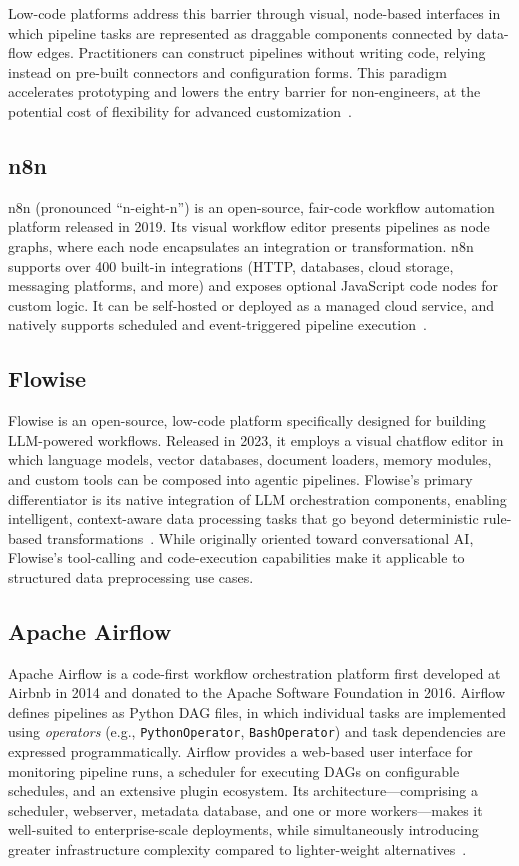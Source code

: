 \documentclass[journal]{IEEEtran}
\begin{document}
Low-code platforms address this barrier through visual, node-based
interfaces in which pipeline tasks are represented as draggable components
connected by data-flow edges. Practitioners can construct pipelines without
writing code, relying instead on pre-built connectors and configuration
forms. This paradigm accelerates prototyping and lowers the entry barrier
for non-engineers, at the potential cost of flexibility for advanced
customization~\cite{goyal2023automated}.

\subsection{n8n}

n8n (pronounced ``n-eight-n'') is an open-source, fair-code workflow
automation platform released in 2019. Its visual workflow editor presents
pipelines as node graphs, where each node encapsulates an integration
or transformation. n8n supports over 400 built-in integrations (HTTP,
databases, cloud storage, messaging platforms, and more) and exposes
optional JavaScript code nodes for custom logic. It can be self-hosted
or deployed as a managed cloud service, and natively supports
scheduled and event-triggered pipeline execution~\cite{n8ndocs}.

\subsection{Flowise}

Flowise is an open-source, low-code platform specifically designed for
building LLM-powered workflows. Released in 2023, it employs a visual
chatflow editor in which language models, vector databases, document
loaders, memory modules, and custom tools can be composed into agentic
pipelines. Flowise's primary differentiator is its native integration of
LLM orchestration components, enabling intelligent, context-aware data
processing tasks that go beyond deterministic rule-based transformations~\cite{flowisedocs}.
While originally oriented toward conversational AI, Flowise's tool-calling
and code-execution capabilities make it applicable to structured data
preprocessing use cases.

\subsection{Apache Airflow}

Apache Airflow is a code-first workflow orchestration platform first
developed at Airbnb in 2014 and donated to the Apache Software Foundation
in 2016. Airflow defines pipelines as Python DAG files, in which individual
tasks are implemented using \textit{operators} (e.g., \texttt{PythonOperator},
\texttt{BashOperator}) and task dependencies are expressed programmatically.
Airflow provides a web-based user interface for monitoring pipeline runs,
a scheduler for executing DAGs on configurable schedules, and an extensive
plugin ecosystem. Its architecture---comprising a scheduler, webserver,
metadata database, and one or more workers---makes it well-suited to
enterprise-scale deployments, while simultaneously introducing greater
infrastructure complexity compared to lighter-weight
alternatives~\cite{airflow2015, kreuzberger2023mlops}.
\end{document}
